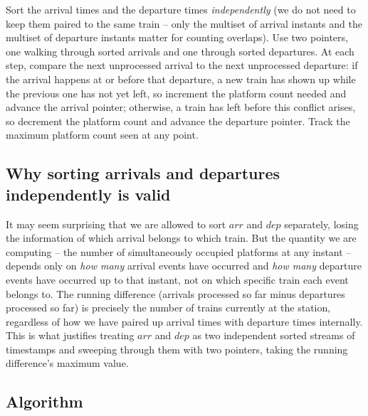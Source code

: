 \begin{ideabox}
Sort the arrival times and the departure times \emph{independently} (we do
not need to keep them paired to the same train -- only the multiset of
arrival instants and the multiset of departure instants matter for counting
overlaps). Use two pointers, one walking through sorted arrivals and one
through sorted departures. At each step, compare the next unprocessed
arrival to the next unprocessed departure: if the arrival happens at or
before that departure, a new train has shown up while the previous one has
not yet left, so increment the platform count needed and advance the
arrival pointer; otherwise, a train has left before this conflict arises, so
decrement the platform count and advance the departure pointer. Track the
maximum platform count seen at any point.
\end{ideabox}

\subsection*{Why sorting arrivals and departures independently is valid}

It may seem surprising that we are allowed to sort $\textit{arr}$ and
$\textit{dep}$ separately, losing the information of which arrival belongs
to which train. But the quantity we are computing -- the number of
simultaneously occupied platforms at any instant -- depends only on
\emph{how many} arrival events have occurred and \emph{how many} departure
events have occurred up to that instant, not on which specific train each
event belongs to. The running difference (arrivals processed so far minus
departures processed so far) is precisely the number of trains currently at
the station, regardless of how we have paired up arrival times with
departure times internally. This is what justifies treating $\textit{arr}$
and $\textit{dep}$ as two independent sorted streams of timestamps and
sweeping through them with two pointers, taking the running difference's
maximum value.

\subsection*{Algorithm}

